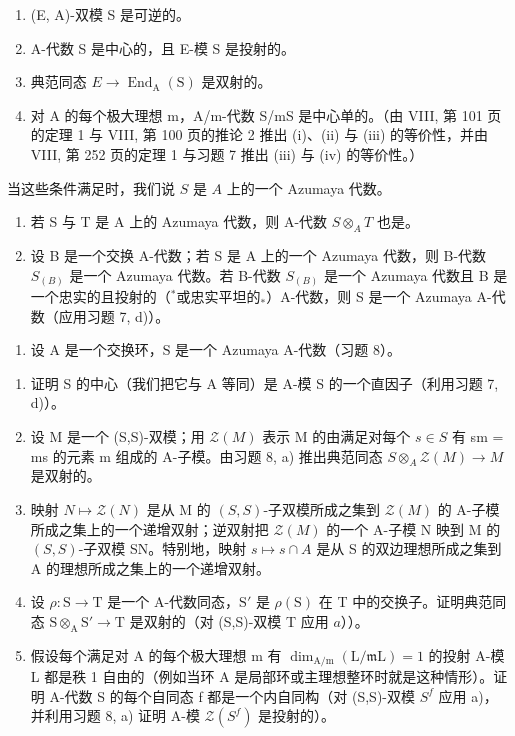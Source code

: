 \begin{enumerate}
\def\labelenumi{(\roman{enumi})}
\item
  (E, A)-双模 S 是可逆的。
\item
  A-代数 S 是中心的，且 E-模 S 是投射的。
\item
  典范同态 \(E \longrightarrow \operatorname{End}_{\mathrm{A}}(\mathrm{S})\) 是双射的。
\item
  对 A 的每个极大理想 m，A/m-代数 S/mS 是中心单的。（由 VIII, 第 101 页的定理 1 与 VIII, 第 100 页的推论 2 推出 (i)、(ii) 与 (iii) 的等价性，并由 VIII, 第 252 页的定理 1 与习题 7 推出 (iii) 与 (iv) 的等价性。）
\end{enumerate}

当这些条件满足时，我们说 \(S\) 是 \(A\) 上的一个 Azumaya 代数。

\begin{enumerate}
\def\labelenumi{\alph{enumi})}
\setcounter{enumi}{1}
\item
  若 S 与 T 是 A 上的 Azumaya 代数，则 A-代数 \(S \otimes_{A} T\) 也是。
\item
  设 B 是一个交换 A-代数；若 S 是 A 上的一个 Azumaya 代数，则 B-代数 \(S_{(B)}\) 是一个 Azumaya 代数。若 B-代数 \(S_{(B)}\) 是一个 Azumaya 代数且 B 是一个忠实的且投射的（\(^{*}\)或忠实平坦的\(_{*}\)）A-代数，则 S 是一个 Azumaya A-代数（应用习题 7, d)）。
\end{enumerate}

\begin{enumerate}
\def\labelenumi{\arabic{enumi})}
\setcounter{enumi}{8}
\tightlist
\item
  设 \(\mathrm{A}\) 是一个交换环，\(\mathrm{S}\) 是一个 Azumaya A-代数（习题 8）。
\end{enumerate}

\begin{enumerate}
\def\labelenumi{\alph{enumi})}
\item
  证明 S 的中心（我们把它与 A 等同）是 A-模 S 的一个直因子（利用习题 7, d)）。
\item
  设 M 是一个 (S,S)-双模；用 \(\mathcal{Z}(M)\) 表示 M 的由满足对每个 \(s \in S\) 有 sm = ms 的元素 m 组成的 A-子模。由习题 8, a) 推出典范同态 \(S \otimes_{A} \mathcal{Z}(M) \to M\) 是双射的。
\item
  映射 \(N \mapsto \mathcal{Z}(N)\) 是从 M 的 \((S, S)\)-子双模所成之集到 \(\mathcal{Z}(M)\) 的 A-子模所成之集上的一个递增双射；逆双射把 \(\mathcal{Z}(M)\) 的一个 A-子模 N 映到 M 的 \((S, S)\)-子双模 SN。特别地，映射 \(s \mapsto s \cap A\) 是从 S 的双边理想所成之集到 A 的理想所成之集上的一个递增双射。
\item
  设 \(\rho : \mathrm{S} \to \mathrm{T}\) 是一个 A-代数同态，\(\mathrm{S}'\) 是 \(\rho(\mathrm{S})\) 在 T 中的交换子。证明典范同态 \(\mathrm{S} \otimes_{\mathrm{A}} \mathrm{S}' \to \mathrm{T}\) 是双射的（对 (S,S)-双模 T 应用 \(a\)））。
\item
  假设每个满足对 A 的每个极大理想 m 有 \(\dim_{\mathrm{A/m}}(\mathrm{L}/\mathfrak{m}\mathrm{L}) = 1\) 的投射 A-模 L 都是秩 1 自由的（例如当环 A 是局部环或主理想整环时就是这种情形）。证明 A-代数 S 的每个自同态 f 都是一个内自同构（对 (S,S)-双模 \(S^{f}\) 应用 a)，并利用习题 8, a) 证明 A-模 \(\mathcal{Z}(S^{f})\) 是投射的）。
\end{enumerate}

